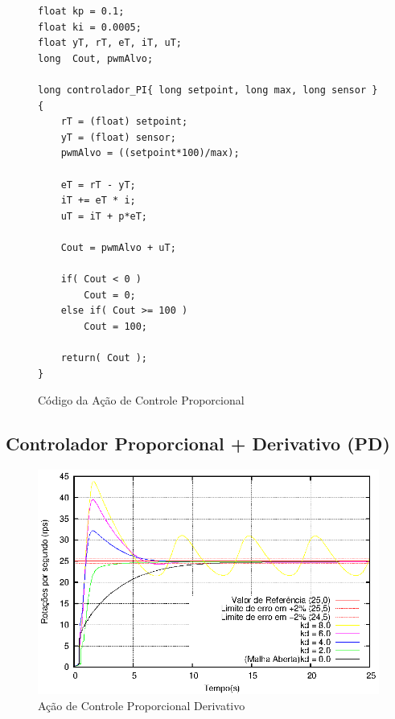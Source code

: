 \begin{figure}[!htb]
\centering
\begin{minipage}{0.8\linewidth}
\begin{lstlisting}
float kp = 0.1;
float ki = 0.0005;
float yT, rT, eT, iT, uT;
long  Cout, pwmAlvo;

long controlador_PI{ long setpoint, long max, long sensor }
{
    rT = (float) setpoint;
    yT = (float) sensor;
    pwmAlvo = ((setpoint*100)/max);

    eT = rT - yT;
    iT += eT * i; 
    uT = iT + p*eT;

    Cout = pwmAlvo + uT;

    if( Cout < 0 )
        Cout = 0;
    else if( Cout >= 100 )
        Cout = 100;

    return( Cout );
}
\end{lstlisting}
\end{minipage}
\caption{Código da Ação de Controle Proporcional}
\label{fig:codigoControladorP}
\end{figure}




\subsection{ Controlador Proporcional + Derivativo (PD) }

\begin{figure}[!htb]
\center\includegraphics[scale=1]{./imagens/acaoPD.eps}
\caption{Ação de Controle Proporcional Derivativo}
\label{fig:acaoPD}
\end{figure}




